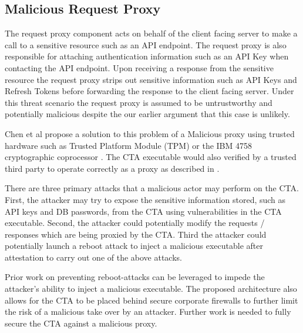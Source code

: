 \documentclass[a4paper,twoside]{article}
\begin{document}
\subsection{Malicious Request Proxy}

The request proxy component acts on behalf of the client facing server to make a call to a sensitive resource such as an API endpoint. The request proxy is also responsible for attaching authentication information such as an API Key when contacting the API endpoint. Upon receiving a response from the sensitive resource the request proxy strips out sensitive information such as API Keys and Refresh Tokens before forwarding the response to the client facing server.  Under this threat scenario the request proxy is assumed to be untrustworthy and potentially malicious despite the our earlier argument that this case is unlikely.

Chen et al \cite{chen_towards_2012} propose a solution to this problem of a Malicious proxy using trusted hardware such as Trusted Platform Module (TPM) or the IBM 4758 cryptographic coprocessor \cite{parno_bootstrapping_2010}.  The CTA executable would also verified by a trusted third party to operate correctly as a proxy as described in \cite{parno_bootstrapping_2010}.

There are three primary attacks that a malicious actor may perform on the CTA. First, the attacker may try to expose the sensitive information stored, such as API keys and DB passwords, from the CTA using vulnerabilities in the CTA executable. Second, the attacker could potentially modify the requests / responses which are being proxied by the CTA. Third the attacker could potentially launch a reboot attack to inject a malicious executable after attestation to carry out one of the above attacks.

Prior work \cite{libert_tracing_2008} \cite{mccune_flicker_2008} on preventing reboot-attacks can be leveraged to impede the attacker's ability to inject a malicious executable. The proposed architecture also allows for the CTA to be placed behind secure corporate firewalls to further limit the risk of a malicious take over by an attacker. Further work is needed to fully secure the CTA against a malicious proxy.


\end{document}
